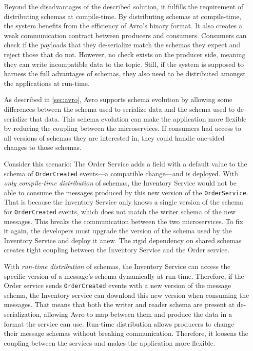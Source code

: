 Beyond the disadvantages of the described solution, it fulfills the requirement of distributing schemas at compile-time.
By distributing schemas at compile-time, the system benefits from the efficiency of Avro's binary format.
It also creates a weak communication contract between producers and consumers.
Consumers can check if the payloads that they de-serialize match the schemas they expect and reject those that do not.
However, no check exists on the producer side, meaning they can write incompatible data to the topic.
Still, if the system is supposed to harness the full advantages of schemas, they also need to be distributed amongst the applications at run-time.

As described in \ref{sec:avro}, Avro supports schema evolution by allowing some differences between the schema used to serialize data and the schema used to de-serialize that data.
This schema evolution can make the application more flexible by reducing the coupling between the microservices.
If consumers had access to all versions of schemas they are interested in, they could handle one-sided changes to those schemas.

Consider this scenario: The Order Service adds a field with a default value to the schema of \texttt{OrderCreated} events---a compatible change---and is deployed.
With \emph{only compile-time distribution} of schemas, the Inventory Service would not be able to consume the messages produced by this new version of the \texttt{OrderService}.
That is because the Inventory Service only knows a single version of the schema for \texttt{OrderCreated} events, which does not match the writer schema of the new messages.
This breaks the communication between the two microservices.
To fix it again, the developers must upgrade the version of the schema used by the Inventory Service and deploy it anew.
The rigid dependency on shared schemas creates tight coupling between the Inventory Service and the Order service.

With \emph{run-time distribution} of schemas, the Inventory Service can access the specific version of a message's schema dynamically at run-time.
Therefore, if the Order service sends \texttt{OrderCreated} events with a new version of the message schema, the Inventory service can download this new version when consuming the messages.
That means that both the writer and reader schema are present at de-serialization, allowing Avro to map between them and produce the data in a format the service can use.
Run-time distribution allows producers to change their message schemas without breaking communication.
Therefore, it loosens the coupling between the services and makes the application more flexible.

